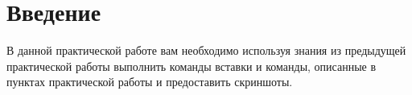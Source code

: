 \section*{\LARGE Введение}

В данной практической работе вам необходимо используя знания из
предыдущей практической работы выполнить команды вставки и команды,
описанные в пунктах практической работы и предоставить скриншоты.

\clearpage

